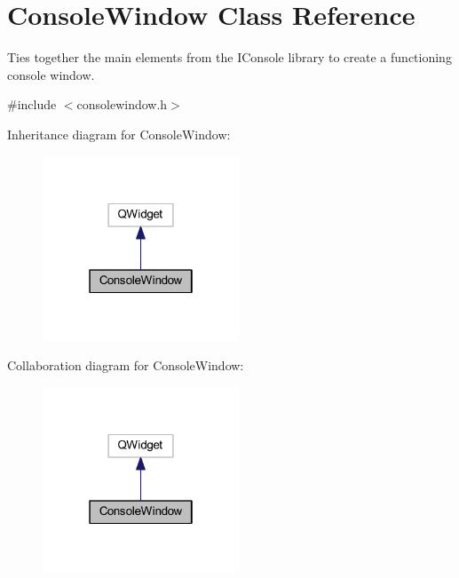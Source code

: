 \hypertarget{class_console_window}{\section{Console\-Window Class Reference}
\label{class_console_window}
}


Ties together the main elements from the I\-Console library to create a functioning console window.  




{\ttfamily \#include $<$consolewindow.\-h$>$}



Inheritance diagram for Console\-Window\-:\nopagebreak
\begin{figure}[H]
\begin{center}
\leavevmode
\includegraphics[width=166pt]{class_console_window__inherit__graph}
\end{center}
\end{figure}


Collaboration diagram for Console\-Window\-:\nopagebreak
\begin{figure}[H]
\begin{center}
\leavevmode
\includegraphics[width=166pt]{class_console_window__coll__graph}
\end{center}
\end{figure}
